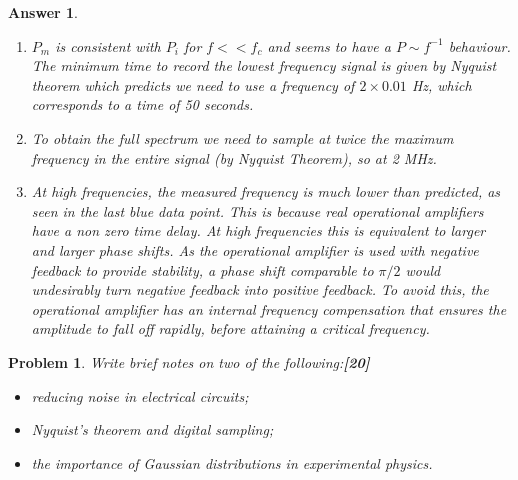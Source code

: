 \documentclass[a4paper]{article}
\newtheorem{ans}{Answer}[subsection]
\theoremstyle{new}
\newtheorem{qns}{Problem}[subsection]
\begin{document}
\begin{ans}
\begin{enumerate}[label=(\roman*)]
\begin{figure}[H]
    \caption{Plot $\ln P_m(f)$ against $\ln f$. Extrapolate two lines to determine $f_c$. The gradient for the grey and orange lines are respectively 0 and $-2$ exactly.}
\end{figure}
\item $P_m$ is consistent with $P_i$ for $f<<f_c$ and seems to have a $P\sim f^{-1}$ behaviour. The minimum time to record the lowest frequency signal is given by Nyquist theorem which predicts we need to use a frequency of $2 \times 0.01$ Hz, which corresponds to a time of 50 seconds.
\item To obtain the full spectrum we need to sample at twice the maximum
frequency in the entire signal (by Nyquist Theorem), so at 2 MHz.
\item At high frequencies, the measured frequency is much lower than predicted, as seen in the last blue data point. This is because real operational amplifiers have a non zero time delay. At high frequencies this is equivalent to larger and larger phase shifts. As the operational amplifier is used with negative feedback to provide stability, a phase shift comparable to $\pi/2$ would undesirably turn negative feedback into positive feedback. To avoid this, the operational amplifier has an internal frequency compensation that ensures the amplitude to fall off rapidly, before attaining a critical frequency.
\end{enumerate}
\end{ans}
\newpage
\begin{qns}
Write brief notes on two of the following:\hfill\textbf{[20]}
\begin{itemize}
    \item reducing noise in electrical circuits;
    \item Nyquist’s theorem and digital sampling;
    \item the importance of Gaussian distributions in experimental physics.
\end{itemize}
\end{qns}
\end{document}
